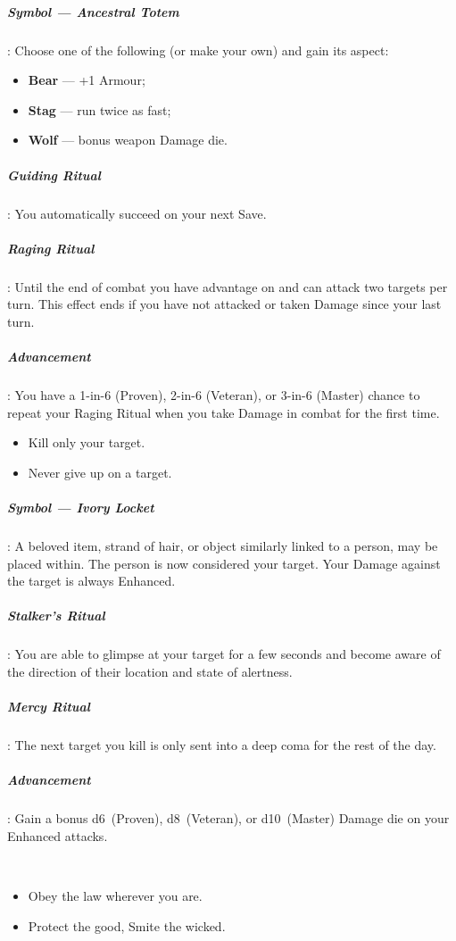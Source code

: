 \documentclass[itdr]{subfiles}
\begin{document}
\subparagraph{Symbol --- Ancestral Totem}: Choose one of the following (or make your own) and gain its aspect:
\begin{itemize}
	\item \textbf{Bear} --- +1 Armour;
	\item \textbf{Stag} --- run twice as fast;
	\item \textbf{Wolf} --- bonus weapon Damage die.
\end{itemize}

\subparagraph{Guiding Ritual}: You automatically succeed on your next Save.

\subparagraph{Raging Ritual}: Until the end of combat you have advantage on  and can attack two targets per turn. This effect ends if you have not attacked or taken Damage since your last turn.

\subparagraph{Advancement}: You have a 1-in-6 (Proven), 2-in-6 (Veteran), or 3-in-6 (Master) chance to repeat your Raging Ritual when you take Damage in combat for the first time.

\vfill
\break

{\em\begin{itemize}
		\item Kill only your target.
		\item Never give up on a target.
\end{itemize}}

\subparagraph{Symbol --- Ivory Locket}: A beloved item, strand of hair, or object similarly linked to a person, may be placed within. The person is now considered your target. Your Damage against the target is always Enhanced.

\subparagraph{Stalker's Ritual}: You are able to glimpse at your target for a few seconds and become aware of the direction of their location and state of alertness.

\subparagraph{Mercy Ritual}: The next target you kill is only sent into a deep coma for the rest of the day.

\subparagraph{Advancement}: Gain a bonus d6~(Proven), d8~(Veteran), or d10~(Master) Damage die on your Enhanced attacks.

~

{\em\begin{itemize}
		\item Obey the law wherever you are.
		\item Protect the good, Smite the wicked.
\end{itemize}}
\end{document}
